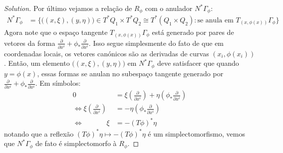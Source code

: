 \begin{proof}[Solution]
Por último vejamos a rela\c c\~ao de $R_\phi$ com o anulador $N^* \Gamma_\phi$:
\begin{align*}
	N^*\Gamma_\phi&=\{\big((x,\xi),(y,\eta)\big)\in T^*Q_1\times T^*Q_2\cong T^*(Q_1\times Q_2):\text{se anula em }T_{(x,\phi(x))}\Gamma_\phi \}
\end{align*}
Agora note que o espaço tangente $T_{(x,\phi(x))}\Gamma_\phi$ está generado por pares de vetores da forma $\frac{\partial }{\partial x^i}+\phi_*\frac{\partial }{\partial x^i}$. Isso segue simplesmente do fato de que em coordenadas locais, os vetores can\'onicos s\~ao as derivadas de curvas $(x_i,\phi(x_i))$. Ent\~ao, um elemento $\big((x,\xi ),(y,\eta)\big)$ em $N^*\Gamma_\phi$ deve satisfacer que quando $y=\phi(x)$, essas formas se anulan no subespaço tangente generado por  $\frac{\partial }{\partial x^i}+\phi_*\frac{\partial }{\partial x^i}$. Em s\'imbolos:
\begin{align*}
	0&=\xi \left( \frac{\partial }{\partial x^i} \right) +\eta\left( \phi_*\frac{\partial }{\partial x^i } \right) \\
\iff	\xi \left( \frac{\partial }{\partial x^i} \right) &=-\eta\left( \phi_*\frac{\partial }{\partial x^i} \right) \\
\iff\qquad\; \quad 	\xi &=-(T\phi)^*\eta
\end{align*}
notando que a reflex\~ao $(T \phi)^*\eta\mapsto -(T\phi)^*\eta$ \'e um simplectomorfismo, vemos que $N^*\Gamma_\phi$ de fato \'e simplectomorfo à $R_\phi$.
\end{proof}



